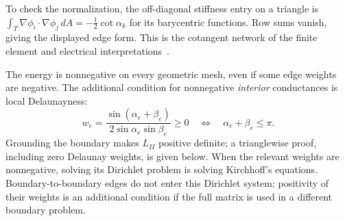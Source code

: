 To check the normalization, the
off-diagonal stiffness entry on a triangle is
$\int_T\nabla\phi_i\cdot\nabla\phi_j\,dA=-\tfrac12\cot\alpha_k$
for its barycentric functions. Row sums vanish, giving the displayed
edge form. This is the cotangent network of the finite element and
electrical interpretations~\cite{DuffinNetworks}.

The energy is nonnegative on every geometric mesh, even if some edge
weights are negative. The additional condition for nonnegative
\emph{interior} conductances is local Delaunayness:
\begin{equation}
 w_e=\frac{\sin(\alpha_e+\beta_e)}
              {2\sin\alpha_e\sin\beta_e}\ge0
 \quad\Longleftrightarrow\quad \alpha_e+\beta_e\le\pi.
 \label{eq:ipolyDelaunayweight}
\end{equation}
Grounding the boundary makes $L_{II}$ positive definite; a trianglewise
proof, including zero Delaunay weights, is given below. When the relevant
weights are nonnegative, solving its Dirichlet problem is solving
Kirchhoff's equations. Boundary-to-boundary edges do not enter
this Dirichlet system; positivity of their weights is an additional
condition if the full matrix is used in a different boundary problem.

